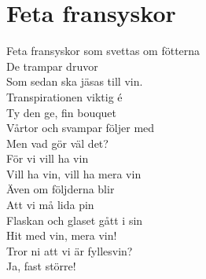 \section{Feta fransyskor}
Feta fransyskor som svettas om fötterna\\
De trampar druvor\\
Som sedan ska jäsas till vin.\\
Transpirationen viktig é\\
Ty den ge, fin bouquet\\
Vårtor och svampar följer med\\
Men vad gör väl det?\\

För vi vill ha vin\\
Vill ha vin, vill ha mera vin\\
Även om följderna blir\\
Att vi må lida pin\\
Flaskan och glaset gått i sin\\
Hit med vin, mera vin!\\
Tror ni att vi är fyllesvin?\\
Ja, fast större!\\